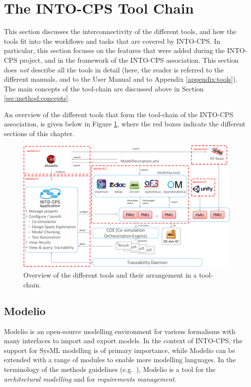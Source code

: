 
\section{The INTO-CPS Tool Chain}\label{sec:toolchain}

This section discusses the interconnectivity of the different tools, and how the tools fit into the workflows and tasks that are covered by INTO-CPS. In particular, this section focuses on the features that were added during the INTO-CPS project, and in the framework of the INTO-CPS association. This section does \textit{not} describe all the tools in detail (here, the reader is referred to the different manuals, and to the User Manual \cite{INTOCPSD4.3a} and to Appendix \ref{appendix:tools}). The main concepts of the tool-chain are discussed above in Section \ref{sec:method:concepts}.

An overview of the different tools that form the tool-chain of the INTO-CPS association, is given below in Figure \ref{fig:tool-chain}, where the red boxes indicate the different sections of this chapter.

\begin{figure}[!ht]
	\centering
		\includegraphics[width=0.9 \textwidth]{./figures/toolchain_association}
	\caption{Overview of the different tools and their arrangement in a tool-chain.}
	\label{fig:tool-chain}
\end{figure}

\subsection{Modelio}
\label{sec:modelio}
Modelio is an open-source modelling environment for various formalisms with many interfaces to import and export models. In the context of INTO-CPS, the support for SysML modelling is of primary importance, while Modelio can be extended with a range of modules to enable more modelling languages. In the terminology of the methods guidelines (e.g.\ \cite{INTOCPSD3.3a}), Modelio is a tool for the \textit{architectural modelling} and for \textit{requirements management}.

